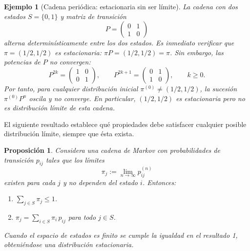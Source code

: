 \documentclass[12pt]{book}
\newtheorem{proposition}{Proposición}[chapter]
\newtheorem{example}{Ejemplo}[chapter]
\begin{document}
\begin{example}[Cadena periódica: estacionaria sin ser límite]
    La cadena con dos estados $S = \{0,1\}$ y matriz de transición
    \[
        P = \begin{pmatrix} 0 & 1 \\ 1 & 0 \end{pmatrix}
    \]
    alterna determinísticamente entre los dos estados. Es inmediato verificar que $\pi = (1/2, 1/2)$ es estacionaria: $\pi P = (1/2, 1/2) = \pi$. Sin embargo, las potencias de $P$ no convergen:
    \[
        P^{2k} = \begin{pmatrix} 1 & 0 \\ 0 & 1 \end{pmatrix}, \qquad
        P^{2k+1} = \begin{pmatrix} 0 & 1 \\ 1 & 0 \end{pmatrix}, \qquad k \ge 0.
    \]
    Por tanto, para cualquier distribución inicial $\pi^{(0)} \neq (1/2, 1/2)$, la sucesión $\pi^{(0)}P^n$ oscila y no converge. En particular, $(1/2, 1/2)$ es estacionaria pero \emph{no} es distribución límite de esta cadena.
\end{example}

El siguiente resultado establece qué propiedades debe satisfacer cualquier posible distribución límite, siempre que ésta exista.

\begin{proposition}
    Considera una cadena de Markov con probabilidades de transición $p_{ij}$ tales que los límites
    \[
        \pi_j := \lim_{n\to\infty} p_{ij}^{(n)}
    \]
    existen para cada $j$ y no dependen del estado $i$. Entonces:
    \begin{enumerate}
        \item $\displaystyle\sum_{j \in S} \pi_j \le 1$.
        \item $\displaystyle\pi_j = \sum_{i \in S} \pi_i\, p_{ij}$ para todo $j \in S$.
    \end{enumerate}
    Cuando el espacio de estados es finito se cumple la igualdad en el resultado 1, obteniéndose una distribución estacionaria.
\end{proposition}
\end{document}
